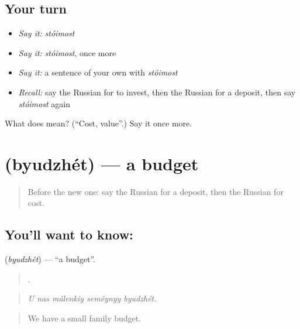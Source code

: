\subsection*{Your turn}
\begin{itemize}
\raggedright
  \item \emph{Say it:} \emph{stóimost}
  \item \emph{Say it:} \emph{stóimost}, once more
  \item \emph{Say it:} a sentence of your own with \emph{stóimost}
  \item \emph{Recall:} say the Russian for to invest, then the Russian for a deposit, then say \emph{stóimost} again
\end{itemize}

\begin{tcolorbox}[breakable,colback=teal!4,colframe=teal!35!black,title={Before you move on}]
What does  mean? (\textquotedblleft{}Cost, value\textquotedblright{}.) Say it once more.
\end{tcolorbox}
\section[\texorpdfstring{\ru{бюджет} (byudzhét)}{бюджет (byudzhét)}]{ (byudzhét) — a budget}

\label{lesson:RU-C395-byudzhet}



\begin{quote}
Before the new one: say the Russian for a deposit, then the Russian for cost.
\end{quote}

\subsection*{You'll want to know: }
\textbf{} (\emph{byudzhét}) — \textquotedblleft{}a budget\textquotedblright{}.

\begin{quote}
    .
\end{quote}

\begin{quote}
\emph{U nas málenkiy seméynyy byudzhét.}
\end{quote}

\begin{quote}
We have a small family budget.
\end{quote}

